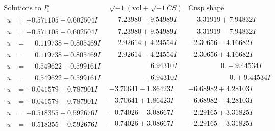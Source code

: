 \documentclass[1p]{elsarticle_modified}
\theoremstyle{definition}
\newcommand{\I}{\sqrt{-1}}
\begin{document}
$$\begin{array}{c|c|c}  
\text{Solutions to }I^u_{1}& \I (\text{vol} + \sqrt{-1}CS) & \text{Cusp shape}\\
 \hline 
\begin{aligned}
u &= -0.571105 + 0.602504 I\end{aligned}
 & \phantom{-}7.23980 - 9.54989 I & \phantom{-}3.31919 + 7.94832 I \\ \hline\begin{aligned}
u &= -0.571105 - 0.602504 I\end{aligned}
 & \phantom{-}7.23980 + 9.54989 I & \phantom{-}3.31919 - 7.94832 I \\ \hline\begin{aligned}
u &= \phantom{-}0.119738 + 0.805469 I\end{aligned}
 & \phantom{-}2.92614 + 4.24554 I & -2.30656 - 4.16682 I \\ \hline\begin{aligned}
u &= \phantom{-}0.119738 - 0.805469 I\end{aligned}
 & \phantom{-}2.92614 - 4.24554 I & -2.30656 + 4.16682 I \\ \hline\begin{aligned}
u &= \phantom{-}0.549622 + 0.599161 I\end{aligned}
 & \phantom{-0.000000 -}6.94310 I & \phantom{-0.000000 } 0. - 9.44534 I \\ \hline\begin{aligned}
u &= \phantom{-}0.549622 - 0.599161 I\end{aligned}
 & \phantom{-0.000000 } -6.94310 I & \phantom{-0.000000 -}0. + 9.44534 I \\ \hline\begin{aligned}
u &= -0.041579 + 0.787901 I\end{aligned}
 & -3.70641 - 1.86423 I & -6.68982 + 4.28103 I \\ \hline\begin{aligned}
u &= -0.041579 - 0.787901 I\end{aligned}
 & -3.70641 + 1.86423 I & -6.68982 - 4.28103 I \\ \hline\begin{aligned}
u &= -0.518355 + 0.592676 I\end{aligned}
 & -0.74026 - 3.08667 I & -2.29165 + 3.31825 I \\ \hline\begin{aligned}
u &= -0.518355 - 0.592676 I\end{aligned}
 & -0.74026 + 3.08667 I & -2.29165 - 3.31825 I \\ \hline\begin{aligned}

\end{aligned}
\end{array}$$
\end{document}
